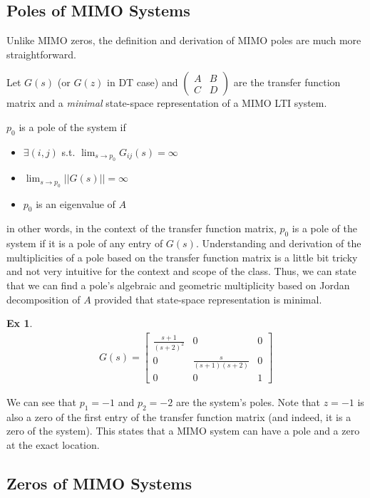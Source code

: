 \documentclass[twoside]{article}
\newtheorem{exmp}[theorem]{Ex}
\begin{document}
\newpage

\subsection{Poles of MIMO Systems}

Unlike MIMO zeros, the definition and derivation of MIMO poles are much more straightforward. 

Let $G(s)$ (or $G(z)$ in DT case) and $\left( \begin{array}{c|c} A & B \\ \hline C & D  \end{array} \right)$ are the transfer function matrix and a \textit{minimal} state-space representation of a MIMO LTI system.

$p_0$ is a pole of the system if 
%
\begin{itemize}
 \item $\exists (i,j)$ s.t. $\lim_{s \to p_0}G_{ij}(s) = \infty$
 \item $\lim_{s \to p_0} || G(s) || = \infty$
 \item $p_0$ is an eigenvalue of $A$
\end{itemize}
%
in other words, in the context of the transfer function matrix, $p_0$ is a pole of the system if it is a pole of any entry of $G(s)$. Understanding and derivation of the multiplicities of a pole based on the transfer function matrix is a little bit tricky and not very intuitive for the context and scope of the class. Thus, we can state that we can find a pole's algebraic and geometric multiplicity based on Jordan decomposition of $A$ provided that state-space representation is minimal. 
%
\begin{exmp}
	\begin{align*}
	G(s) = \left[ \begin{array}{ccc} \frac{s+1}{(s+2)^2} & 0 & 0 \\  
	0 & \frac{s}{(s+1)(s+2)} & 0 \\ 0 & 0 & 1  \end{array} \right]
	\end{align*}
\end{exmp}
%
We can see that $p_1 = -1$ and $p_2 = -2$ are the system's poles. Note that $z = -1$ is also a zero of the 
first entry of the transfer function matrix (and indeed, it is a zero of the system). This states that a MIMO system can have a pole and a zero at the exact location. 

\subsection{Zeros of MIMO Systems}
\end{document}
